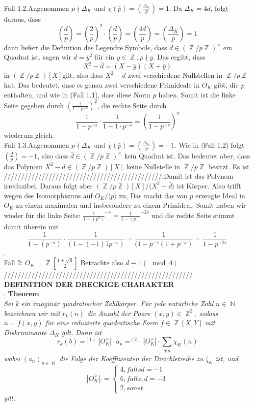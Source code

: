 \documentclass[10pt,a4paper]{article}
\DeclareMathOperator{\Z}{\mathbb{Z}}
\DeclareMathOperator{\N}{\mathbb{N}}
\begin{document}
\\
Fall 1.2.Angenommen $p \nmid \Delta_K$ und $\chi(\bar{p})=(\frac{\Delta_K}{p})= 1$. Da $\Delta_K = 4d$, folgt daraus, dass $$(\frac{d}{p})=(\frac{2}{p})^2\cdot (\frac{d}{p})=(\frac{4d}{p})=(\frac{\Delta_K}{p})=1$$ dann liefert die Definition des Legendre Symbols, dass $\bar{d} \in (\Z/p\Z)^\times$ ein Quadrat ist, sagen wir $\bar{d}=\bar{y}^2$ für ein $y \in \Z, p\nmid y$. Das ergibt, dass $$X^2-\bar{d}=(X-\bar{y})(X+\bar{y})$$ in $(\Z/p\Z)[X] $gilt, also dass $X^2-\bar{d}$ zwei verschiedene Nullstellen in $\Z/p\Z$ hat. Das bedeutet, dass es genau zwei verschiedene Primideale in $O_K$ gibt, die $p$ enthalten, und wie in (Fall 1.1), dass diese Norm $p$ haben. Somit ist die linke Seite gegeben durch $(\frac{1}{1-p^{-s}})^2$, die rechte Seite durch $$\frac{1}{1-p^{-s}}\cdot\frac{1}{1-1\cdot p^{-s}}=(\frac{1}{1-p^{-s}})^2$$ wiederum gleich.
\\
Fall 1.3.Angenommen $p \nmid \Delta_K$ und $\chi(\bar{p})=(\frac{\Delta_K}{p})= -1$. Wie in (Fall 1.2) folgt $(\frac{d}{p})=-1$, also dass $\bar{d} \in (\Z/p\Z)^\times$ kein Quadrat ist. Das bedeutet aber, dass das Polynom $X^2-\bar{d} \in (\Z/p\Z)[X] $ keine Nullstelle in $\Z/p\Z$ besitzt. Es ist //////////////////////////////////////////////.Damit ist das Polynom irreduzibel. Daraus folgt aber $(\Z/p\Z)[X]/\langle X^{2}-\bar{d}\rangle$ ist Körper. Also trifft wegen des Isomorphismus auf $O_K/\langle p\rangle$ zu, Das macht das von $p$ erzeugte Ideal in $O_K$ zu einem maximalen und insbesondere zu einem Primideal. Somit haben wir wieder für die linke Seite: $\frac{1}{1-(p^{2})}^{-s}=\frac{1}{1-(p)}^{-2s}$ und die rechte Seite stimmt damit überein mit $$\frac{1}{1-(p^{-s})}\cdot\frac{1}{(1-(-1)1p^{-s})}=\frac{1}{(1-p^{-s}(1+p^{-s})}=\frac{1}{1-p^{-2s}}$$.
\\
Fall 2: $O_K= \Z[\frac{1+\sqrt{d}}{2}]$
Betrachte also $d\equiv 1 (\mod 4)$
///////////////////////////////////////////////////////
\\
\textbf{DEFINITION DER DRECKIGE CHARAKTER }
\\‚
\textbf{Theorem}
\\
\textit{Sei k ein imaginär quadratischer Zahlkörper. Für jede natürliche Zahl $n \in \N$ bezeichnen wir mit $r_k(n)$ die Anzahl der Paare $(x,y) \in \Z^2$, sodass $n = f(x,y)$ für eine reduzierte quadratische Form $f \in \Z[X,Y]$ mit Diskriminante $\Delta_K$ gilt. Dann ist $$r_k(b) =^{(1)} |O_K^\times|\cdot a_n =^{(2)} |O_K^\times|\cdot \sum_{d|n}\chi_K(n)$$wobei $(a_n)_{n \in \N}$ die Folge der Koeffizienten der Dirichletreihe zu $\zeta_K$ ist, und $$|O_K^\times|\cdot =\begin{cases}4, falls d = -1\\6, falls,d = -3\\2, sonst\end{cases}$$ gilt.}
\end{document}
